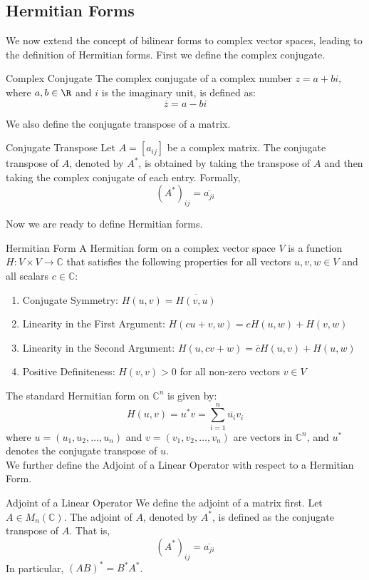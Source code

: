 \documentclass[openany]{book}
\renewcommand{\C}{\mathbb{C}}
\begin{document}
\subsection{Hermitian Forms}
We now extend the concept of bilinear forms to complex vector spaces, leading to the definition of Hermitian forms. First we define the complex conjugate.
\begin{mydefinition}{Complex Conjugate}
The complex conjugate of a complex number $z = a + bi$, where $a, b \in \R$ and $i$ is the imaginary unit, is defined as:
$$\overline{z} = a - bi$$
\end{mydefinition}
We also define the conjugate transpose of a matrix.
\begin{mydefinition}{Conjugate Transpose}
Let $A = [a_{ij}]$ be a complex matrix. The conjugate transpose of $A$, denoted by $A^*$, is obtained by taking the transpose of $A$ and then taking the complex conjugate of each entry. Formally,
$$(A^*)_{ij} = \overline{a_{ji}}$$
\end{mydefinition}
Now we are ready to define Hermitian forms.
\begin{mydefinition}{Hermitian Form}
A Hermitian form on a complex vector space $V$ is a function $H: V \times V \to \C$ that satisfies the following properties for all vectors $u, v, w \in V$ and all scalars $c \in \C$:
\begin{enumerate}
    \item Conjugate Symmetry: $H(u, v) = \overline{H(v, u)}$
    \item Linearity in the First Argument: $H(cu + v, w) = cH(u, w) + H(v, w)$
    \item Linearity in the Second Argument: $H(u, cv + w) = \overline{c}H(u, v) + H(u, w)$
    \item Positive Definiteness: $H(v, v) > 0$ for all non-zero vectors $v \in V$
\end{enumerate}
\end{mydefinition}
The standard Hermitian form on $\C^n$ is given by:
$$H(u, v) = u^* v = \sum_{i=1}^n \overline{u_i} v_i$$
where $u = (u_1, u_2, \ldots, u_n)$ and $v = (v_1, v_2, \ldots, v_n)$ are vectors in $\C^n$, and $u^*$ denotes the conjugate transpose of $u$. \\
We further define the Adjoint of a Linear Operator with respect to a Hermitian Form.
\begin{mydefinition}{Adjoint of a Linear Operator}
We define the adjoint of a matrix first. Let $A \in M_n(\C)$. The adjoint of $A$, denoted by $A^*$, is defined as the conjugate transpose of $A$. That is,
$$(A^*)_{ij} = \overline{a_{ji}}$$
In particular, $(AB)^* = B^* A^*$. 
\end{mydefinition}
\end{document}

